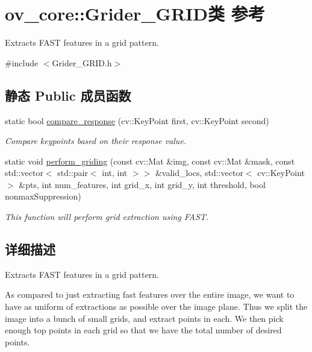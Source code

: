 \hypertarget{classov__core_1_1Grider__GRID}{}\section{ov\+\_\+core\+:\+:Grider\+\_\+\+G\+R\+I\+D类 参考}
\label{classov__core_1_1Grider__GRID}


Extracts F\+A\+ST features in a grid pattern.  




{\ttfamily \#include $<$Grider\+\_\+\+G\+R\+I\+D.\+h$>$}

\subsection*{静态 Public 成员函数}
\begin{DoxyCompactItemize}
\item 
static bool \hyperlink{classov__core_1_1Grider__GRID_a6e78e323f7c99e2a13be240345c564f3}{compare\+\_\+response} (cv\+::\+Key\+Point first, cv\+::\+Key\+Point second)
\begin{DoxyCompactList}\small\item\em Compare keypoints based on their response value. \end{DoxyCompactList}\item 
static void \hyperlink{classov__core_1_1Grider__GRID_a5021984f1ab36317c43ea3beddfd34e2}{perform\+\_\+griding} (const cv\+::\+Mat \&img, const cv\+::\+Mat \&mask, const std\+::vector$<$ std\+::pair$<$ int, int $>$$>$ \&valid\+\_\+locs, std\+::vector$<$ cv\+::\+Key\+Point $>$ \&pts, int num\+\_\+features, int grid\+\_\+x, int grid\+\_\+y, int threshold, bool nonmax\+Suppression)
\begin{DoxyCompactList}\small\item\em This function will perform grid extraction using F\+A\+ST. \end{DoxyCompactList}\end{DoxyCompactItemize}


\subsection{详细描述}
Extracts F\+A\+ST features in a grid pattern. 

As compared to just extracting fast features over the entire image, we want to have as uniform of extractions as possible over the image plane. Thus we split the image into a bunch of small grids, and extract points in each. We then pick enough top points in each grid so that we have the total number of desired points. 


